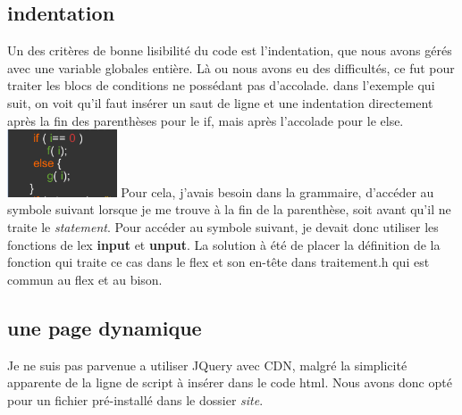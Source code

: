 \subsection{indentation}
	Un des critères de bonne lisibilité du code est l'indentation, que nous avons gérés avec une variable globales entière. Là ou nous avons eu des difficultés, ce fut pour traiter les blocs de conditions ne possédant pas d'accolade.
	\newline
	dans l'exemple qui suit, on voit qu'il faut insérer un saut de ligne et une indentation directement après la fin des parenthèses pour le if, mais après l'accolade pour le else. \newline
	\includegraphics[height=2cm]{site/indent1.png} 
	\newline 
Pour cela, j'avais besoin dans la grammaire, d'accéder au symbole suivant lorsque je me trouve à la fin de la parenthèse, soit avant qu'il ne traite le \textit{statement}. \newline 
Pour accéder au symbole suivant, je devait donc utiliser les fonctions de lex \textbf{input} et \textbf{unput}. \newline
La solution à été de placer la définition de la fonction qui traite ce cas dans le flex et son en-tête dans traitement.h qui est commun au flex et au bison.

\subsection{une page dynamique}
Je ne suis pas parvenue a utiliser JQuery avec CDN, malgré la simplicité apparente de la ligne de script à insérer dans le code html. Nous avons donc opté pour un fichier pré-installé dans le dossier \textit{site}. \newline

